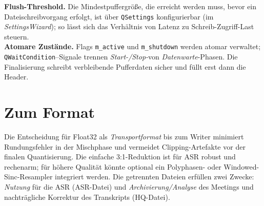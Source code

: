 \textbf{Flush-Threshold.} Die Mindestpuffergröße, die erreicht werden muss, bevor ein Dateischreibvorgang erfolgt, ist über \texttt{QSettings} konfigurierbar (im \emph{SettingsWizard}); so lässt sich das Verhältnis von Latenz zu Schreib-Zugriff-Last steuern.\\

\textbf{Atomare Zustände.} Flags \texttt{m\_active} und \texttt{m\_shutdown} werden atomar verwaltet; \texttt{QWaitCondition}–Signale trennen \emph{Start-/Stop-}von \emph{Datenwarte}-Phasen. Die Finalisierung schreibt verbleibende Pufferdaten sicher und füllt erst dann die Header.



\section{Zum Format}
\label{sec:wav-format}

Die Entscheidung für Float32 als \emph{Transportformat} bis zum Writer minimiert Rundungsfehler in der Mischphase und vermeidet Clipping-Artefakte vor der finalen Quantisierung. Die einfache 3:1-Reduktion ist für ASR robust und rechenarm; für höhere Qualität könnte optional ein Polyphasen- oder Windowed-Sinc-Resampler integriert werden. Die getrennten Dateien erfüllen zwei Zwecke: \emph{Nutzung} für die ASR (ASR-Datei) und \emph{Archivierung/Analyse} des Meetings und nachträgliche Korrektur des Transkripts (HQ-Datei).